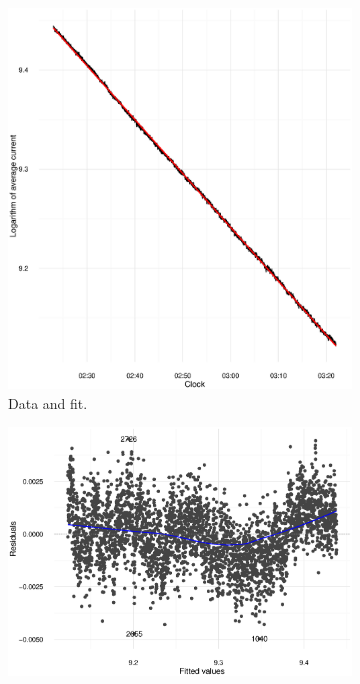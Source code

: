 \documentclass[reprint]{revtex4-1}
\newcommand{\scl}{.4}
\begin{document}
\begin{figure}
\centering
\begin{subfigure}{.5\textwidth}
\includegraphics[scale=\scl]{img/Run969_Data_AND_Fit.eps}
\caption{Data and fit.}
\end{subfigure}
\begin{subfigure}{.5\textwidth}
\includegraphics[scale=\scl]{img/Run969_Res_VS_Fit.eps}

\end{subfigure}
\end{figure}
\end{document}
